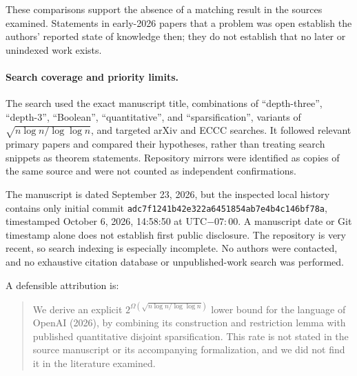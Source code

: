 \documentclass[11pt]{article}
\begin{document}
These comparisons support the absence of a matching result in the sources
examined. Statements in early-2026 papers that a problem was open establish
the authors' reported state of knowledge then; they do not establish that
no later or unindexed work exists.

\paragraph{Search coverage and priority limits.}
The search used the exact manuscript title, combinations of
``depth-three'', ``depth-3'', ``Boolean'', ``quantitative'', and
``sparsification'', variants of $\sqrt{n\log n/\log\log n}$, and targeted
arXiv and ECCC searches. It followed relevant primary papers and compared
their hypotheses, rather than treating search snippets as theorem statements.
Repository mirrors were identified as copies of the same source and were
not counted as independent confirmations.

The manuscript is dated September 23, 2026, but the inspected local history
contains only initial commit
\texttt{adc7f1241b42e322a6451854ab7e4b4c146bf78a}, timestamped
October 6, 2026, 14:58:50 at UTC$-07{:}00$. A manuscript date or Git
timestamp alone does not establish first public disclosure. The repository
is very recent, so search indexing is especially incomplete. No authors
were contacted, and no exhaustive citation database or unpublished-work
search was performed.

A defensible attribution is:
\begin{quote}
We derive an explicit $2^{\Omega(\sqrt{n\log n/\log\log n})}$ lower
bound for the language of OpenAI (2026), by combining its construction
and restriction lemma with published quantitative disjoint sparsification.
This rate is not stated in the source manuscript or its accompanying
formalization, and we did not find it in the literature examined.
\end{quote}
\end{document}
